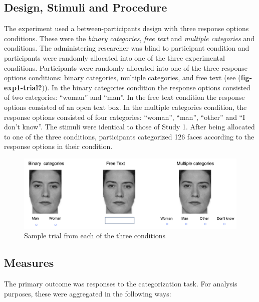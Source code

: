 \documentclass[
  man]{apa7}
\begin{document}
\hypertarget{design-stimuli-and-procedure}{%
\subsection{Design, Stimuli and Procedure}\label{design-stimuli-and-procedure}}

The experiment used a between-participants design with three response options conditions. These were the \emph{binary categories}, \emph{free text} and \emph{multiple categories} and conditions. The administering researcher was blind to participant condition and participants were randomly allocated into one of the three experimental conditions. Participants were randomly allocated into one of the three response options conditions: binary categories, multiple categories, and free text (see (\textbf{fig-exp1-trial?})). In the binary categories condition the response options consisted of two categories: ``woman'' and ``man''. In the free text condition the response options consisted of an open text box. In the multiple categories condition, the response options consisted of four categories: ``woman'', ``man'', ``other'' and ``I don't know''. The stimuli were identical to those of Study 1. After being allocated to one of the three conditions, participants categorized 126 faces according to the response options in their condition.

\begin{figure}
\hypertarget{fig-exp1-trial}{%
\centering
\includegraphics{pix/exp1.png}
\caption{Sample trial from each of the three conditions}\label{fig-exp1-trial}
}
\end{figure}

\hypertarget{measures}{%
\subsection{Measures}\label{measures}}

The primary outcome was responses to the categorization task. For analysis purposes, these were aggregated in the following ways:
\end{document}
